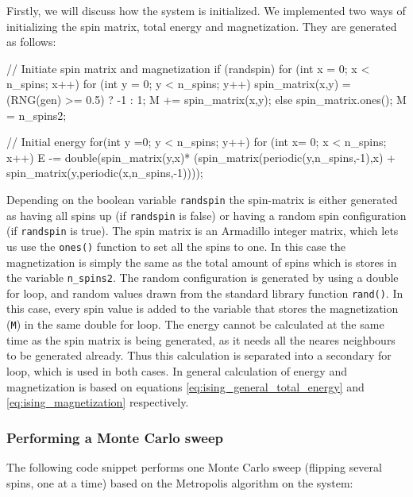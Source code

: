 \documentclass[reprint,english,notitlepage]{revtex4-1}  %
\begin{document}
Firstly, we will discuss how the system is initialized. We implemented two ways of initializing the spin matrix, total energy and magnetization. They are generated as follows:

\begin{cpp}
// Initiate spin matrix and magnetization
if (randspin) {
  for (int x = 0; x < n_spins; x++) {
    for (int y = 0; y < n_spins; y++) {
      spin_matrix(x,y) = (RNG(gen) >= 0.5) ? -1 : 1;
      M += spin_matrix(x,y);
    }
  }
} else {
  spin_matrix.ones();
  M = n_spins2;
}


// Initial energy
for(int y =0; y < n_spins; y++) {
  for (int x= 0; x < n_spins; x++){
    E -=  double(spin_matrix(y,x)*
          (spin_matrix(periodic(y,n_spins,-1),x) +
          spin_matrix(y,periodic(x,n_spins,-1))));
  }
}
\end{cpp}

Depending on the boolean variable \verb+randspin+ the spin-matrix is either generated as having all spins up (if \verb+randspin+ is false) or having a random spin configuration (if \verb+randspin+ is true). The spin matrix is an Armadillo \citep{Armadillo} integer matrix, which lets us use the \verb+ones()+ function to set all the spins to one. In this case the magnetization is simply the same as the total amount of spins which is stores in the variable \verb+n_spins2+. The random configuration is generated by using a double for loop, and random values drawn from the standard library function \verb+rand()+. In this case, every spin value is added to the variable that stores the magnetization (\verb+M+) in the same double for loop. The energy cannot be calculated at the same time as the spin matrix is being generated, as it needs all the neares neighbours to be generated already. Thus this calculation is separated into a secondary for loop, which is used in both cases. In general calculation of energy and magnetization is based on equations  \eqref{eq:ising_general_total_energy} and \eqref{eq:ising_magnetization} respectively.


\subsubsection{Performing a Monte Carlo sweep} \label{sec:III:a:ii}

The following code snippet performs one Monte Carlo sweep (flipping several spins, one at a time) based on the Metropolis algorithm on the system:
\end{document}
